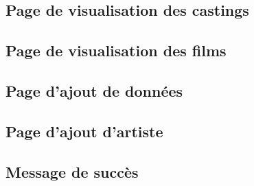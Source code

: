 \documentclass{article}
\begin{document}
\begin{center}
\end{center}

\begin{center}
\end{center}

\subsection{Page de visualisation des castings}

\begin{center}
\end{center}

\subsection{Page de visualisation des films}

\begin{center}
\end{center}

\subsection{Page d'ajout de données}

\begin{center}
\end{center}

\subsection{Page d'ajout d'artiste}

\begin{center}
\end{center}

\subsection{Message de succès}

\begin{center}
\end{center}




  
\end{document}
